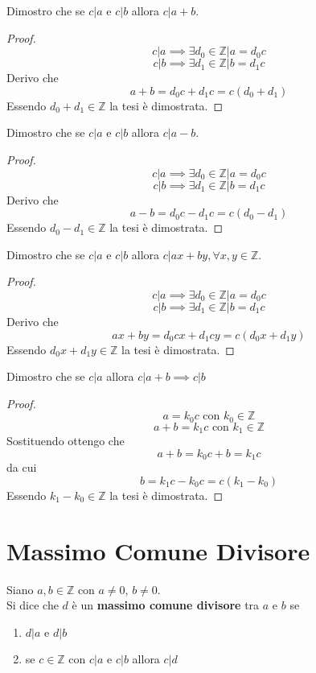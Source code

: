 \documentclass[a4paper,12pt, oneside]{book}
\begin{document}
\begin{shaded}
	\begin{esempio}
		Dimostro che se $c|a$ e $c|b$ allora $c|a+b$.
		\begin{proof}
			$$c|a \implies \exists d_0 \in \mathbb{Z} | a=d_0c$$
			$$c|b \implies \exists d_1 \in \mathbb{Z} | b=d_1c$$
			Derivo che
			$$a+b = d_0c + d_1c = c(d_0+d_1)$$
			Essendo $d_0+d_1 \in \mathbb{Z}$ la tesi è dimostrata.
		\end{proof}
	\end{esempio}
	\begin{esempio}
		Dimostro che se $c|a$ e $c|b$ allora $c|a-b$.
		\begin{proof}
			$$c|a \implies \exists d_0 \in \mathbb{Z} | a=d_0c$$
			$$c|b \implies \exists d_1 \in \mathbb{Z} | b=d_1c$$
			Derivo che
			$$a-b = d_0c - d_1c = c(d_0-d_1)$$
			Essendo $d_0-d_1 \in \mathbb{Z}$ la tesi è dimostrata.
		\end{proof}
	\end{esempio}
	\begin{esempio}
		Dimostro che se $c|a$ e $c|b$ allora $c|ax+by, \forall x,y \in \mathbb{Z}$.
		\begin{proof}
			$$c|a \implies \exists d_0 \in \mathbb{Z} | a=d_0c$$
			$$c|b \implies \exists d_1 \in \mathbb{Z} | b=d_1c$$
			Derivo che
			$$ax+by = d_0cx + d_1cy = c(d_0x+d_1y)$$
			Essendo $d_0x+d_1y \in \mathbb{Z}$ la tesi è dimostrata.
		\end{proof}
	\end{esempio}
	\begin{esempio}
		Dimostro che se $c|a$ allora $c|a+b \implies c|b$
		\begin{proof}
			$$a = k_0c \mbox{ con } k_0 \in \mathbb{Z}$$
			$$a+b = k_1c \mbox{ con } k_1 \in \mathbb{Z}$$
			Sostituendo ottengo che
			$$a + b = k_0c + b = k_1c$$
			da cui $$b = k_1c-k_0c = c(k_1-k_0)$$
			Essendo $k_1-k_0 \in \mathbb{Z}$ la tesi è dimostrata.
		\end{proof}
	\end{esempio}
\end{shaded}
\section{Massimo Comune Divisore}
\begin{definizione}
	Siano $a,b \in \mathbb{Z}$ con $a \not = 0$, $b \not = 0$.\\
	Si dice che $d$ è un \textbf{massimo comune divisore} tra $a$ e $b$ se
	\begin{enumerate}
		\item $d|a$ e $d|b$
		\item se $c \in \mathbb{Z}$ con $c|a$ e $c|b$ allora $c|d$
	\end{enumerate}
\end{definizione}
\end{document}
